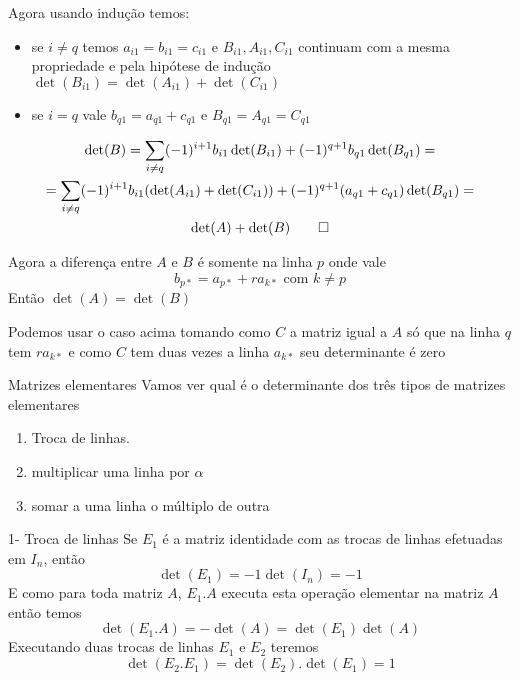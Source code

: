 \documentclass{beamer}
\begin{document}
\begin{frame}
  Agora usando indução temos:
  \begin{itemize}
    \item se $i\neq q$ temos $a_{i1}=b_{i1} =c_{i1}$ e $B_{i1}, A_{i1}, C_{i1}$ continuam com a mesma propriedade e pela hipótese de indução $\det(B_{i1})=\det(A_{i1})+ \det(C_{i1})$
    \item se $i = q$ vale $b_{q1} = a_{q1} + c_{q1}$ e $B_{q1}=A_{q1}=C_{q1}$
  \end{itemize}
  \begin{gather*}
    \det(B) =\sum_{i\neq q} (-1)^{i+1}b_{i1}\det(B_{i1}) + (-1)^{q+1}b_{q1}\det(B_{q1}) = \\
=\sum_{i\neq q} (-1)^{i+1}b_{i1}(\det(A_{i1})+\det(C_{i1})) + (-1)^{q+1}(a_{q1}+ c_{q1})\det(B_{q1}) = \\
\det(A) + \det(B) \qed
  \end{gather*}
\end{frame}

\begin{frame}
  Agora a diferença entre $A$ e $B$ é somente na linha $p$ onde
  vale 
  $$b_{p*} = a_{p*} + ra_{k*} \text{ com } k\neq p$$
  Então $\det(A) = \det(B)$
  
  Podemos usar o caso acima tomando como $C$ a matriz igual a $A$ só que na linha $q$ tem $ra_{k*}$
e como $C$ tem duas vezes a linha $a_{k*}$ seu determinante é zero
  
\end{frame}

\begin{frame}{Matrizes elementares}
  Vamos ver qual é o determinante dos três tipos de matrizes 
  elementares
  \begin{enumerate}
    \item Troca de linhas.
    \item multiplicar uma linha por $\alpha$
    \item somar a uma linha o múltiplo de outra
  \end{enumerate}
\end{frame}
\begin{frame}{1- Troca de linhas}
    Se $E_1$ é a matriz identidade com as trocas de linhas
    efetuadas em $I_n$, então 
    $$ \det(E_1) = -1\det(I_n) = -1 $$
    E como para toda matriz $A$, $E_1.A$ executa esta 
    operação elementar na matriz $A$ então temos
    $$ \det(E_1.A)=-\det(A)=\det(E_1)\det(A)$$
    Executando duas trocas de linhas $E_1$ e $E_2$
    teremos
    $$\det(E_2.E_1)=\det(E_2).\det(E_1) =1$$
  \end{frame}
  
\end{document}
